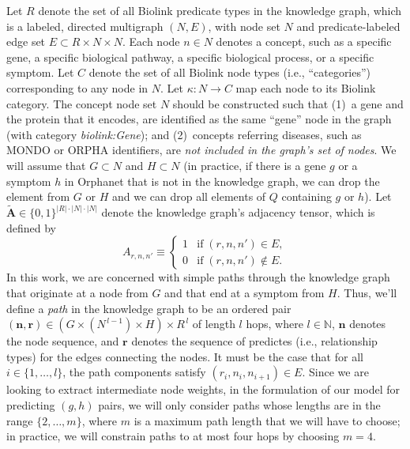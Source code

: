 \documentclass[11pt,notitlepage,english]{article}
\begin{document}
Let $R$ denote the set of all Biolink predicate types in the knowledge
graph, which is a labeled, directed multigraph $(N, E)$,
with node set $N$ and predicate-labeled edge set
$E \subset R \times N \times N$. Each node $n \in N$
denotes a concept, such as a specific gene, a specific biological pathway, a
specific biological process, or a specific symptom.  Let $C$ denote
the set of all Biolink node types (i.e., ``categories'') corresponding to any
node in $N$. Let $\kappa:N\rightarrow C$ map each
node to its Biolink category.  The concept node set $N$ should be
constructed such that (1)~a gene and the protein that it encodes, are identified
as the same ``gene'' node in the graph (with category {\em biolink:Gene\/}); and
(2)~concepts referring diseases, such as MONDO or ORPHA identifiers, are {\em
  not included in the graph's set of nodes}.  We will assume that $G
\subset N$ and $H \subset N$ (in practice, if
there is a gene $g$ or a symptom $h$ in Orphanet that is not in the knowledge
graph, we can drop the element from $G$ or $H$ and we can
drop all elements of $Q$ containing $g$ or $h$). Let
$\widetilde{\boldsymbol A} \in {\{ 0, 1 \}}^{|R| \cdot |N|
  \cdot |N|}$ denote the knowledge graph's adjacency tensor, which is
defined by
\begin{equation}
  A_{r,n,n'} \equiv \begin{cases}
    1 & \textrm{if} \; (r, n, n') \in E, \\
    0 & \textrm{if} \; (r, n, n') \not\in E.
    \end{cases}
\end{equation}
In this work, we are concerned with simple paths through the knowledge graph
that originate at a node from $G$ and that end at a symptom from $H$.  Thus,
we'll define a {\em path\/} in the knowledge graph to be an ordered pair
$({\boldsymbol n},{\boldsymbol r}) \in (G \times {( N^{\,l-1} )} \times H)
\times R^{\,l}$ of length $l$ hops, where $l \in {\mathbb N}$, ${\boldsymbol n}$
denotes the node sequence, and ${\boldsymbol r}$ denotes the sequence of
predictes (i.e., relationship types) for the edges connecting the nodes. It must
be the case that for all $i \in \{1, \ldots, l\}$, the path components satisfy
$(r_i, n_{i}, n_{i+1}) \in E$. Since we are looking to extract intermediate node
weights, in the formulation of our model for predicting $(g,h)$ pairs, we will
only consider paths whose lengths are in the range $\{2, \ldots, m\}$, where $m$
is a maximum path length that we will have to choose; in practice, we will
constrain paths to at most four hops by choosing $m=4$.
\end{document}
